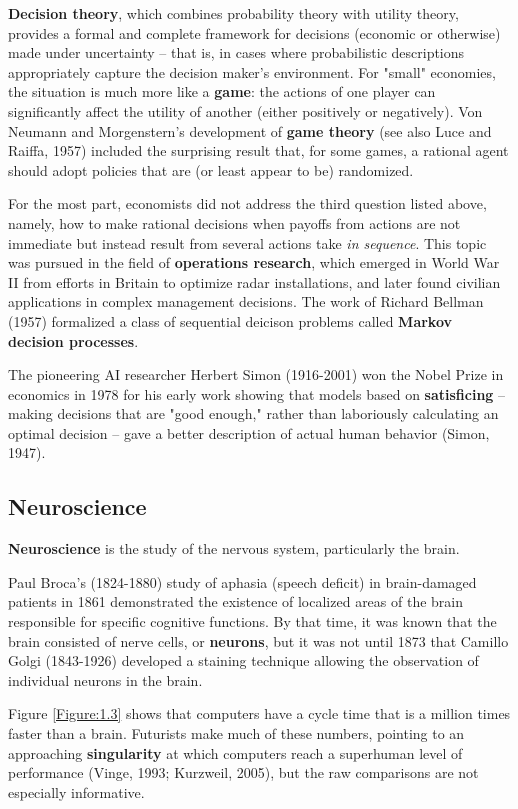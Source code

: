 \documentclass[a4paper,10pt,twoside]{book}
\begin{document}
\textbf{Decision theory}, which combines probability theory with utility theory, provides a formal and complete framework for decisions (economic or otherwise) made under uncertainty -- that is, in cases where probabilistic descriptions appropriately capture the decision maker's environment. For "small" economies, the situation is much more like a \textbf{game}: the actions of one player can significantly affect the utility of another (either positively or negatively). Von Neumann and Morgenstern's development of \textbf{game theory} (see also Luce and Raiffa, 1957) included the surprising result that, for some games, a rational agent should adopt policies that are (or least appear to be) randomized.

For the most part, economists did not address the third question listed above, namely, how to make rational decisions when payoffs from actions are not immediate but instead result from several actions take \textit{in sequence}. This topic was pursued in the field of \textbf{operations research}, which emerged in World War II from efforts in Britain to optimize radar installations, and later found civilian applications in complex management decisions. The work of Richard Bellman (1957) formalized a class of sequential deicison problems called \textbf{Markov decision processes}.

The pioneering AI researcher Herbert Simon (1916-2001) won the Nobel Prize in economics in 1978 for his early work showing that models based on \textbf{satisficing} -- making decisions that are "good enough," rather than laboriously calculating an optimal decision -- gave a better description of actual human behavior (Simon, 1947).

\subsection{Neuroscience}

\textbf{Neuroscience} is the study of the nervous system, particularly the brain.

Paul Broca's (1824-1880) study of aphasia (speech deficit) in brain-damaged patients in 1861 demonstrated the existence of localized areas of the brain responsible for specific cognitive functions. By that time, it was known that the brain consisted of nerve cells, or \textbf{neurons}, but it was not until 1873 that Camillo Golgi (1843-1926) developed a staining technique allowing the observation of individual neurons in the brain.

Figure \ref{Figure:1.3} shows that computers have a cycle time that is a million times faster than a brain. Futurists make much of these numbers, pointing to an approaching \textbf{singularity} at which computers reach a superhuman level of performance (Vinge, 1993; Kurzweil, 2005), but the raw comparisons are not especially informative.
\end{document}
